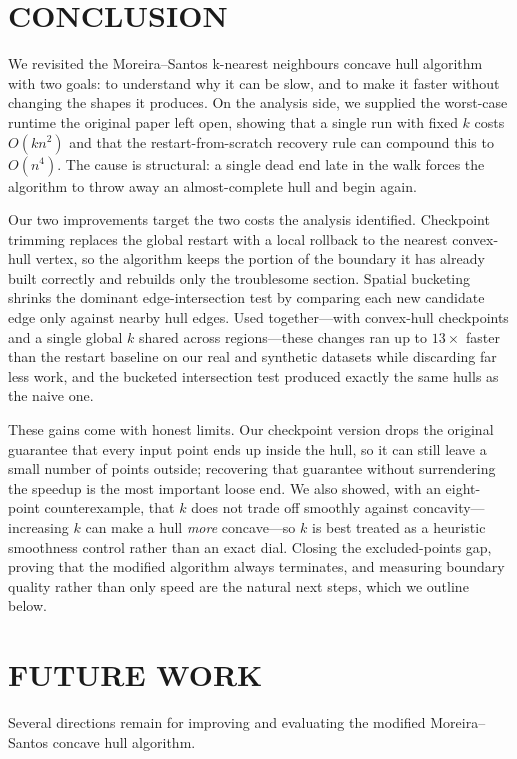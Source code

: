 \documentclass[a4paper,twoside]{article}
\begin{document}
\section{\uppercase{Conclusion}}
We revisited the Moreira--Santos k-nearest neighbours concave hull algorithm with two goals: to understand why it can be slow, and to make it faster without changing the shapes it produces. On the analysis side, we supplied the worst-case runtime the original paper left open, showing that a single run with fixed $k$ costs $O(kn^2)$ and that the restart-from-scratch recovery rule can compound this to $O(n^4)$. The cause is structural: a single dead end late in the walk forces the algorithm to throw away an almost-complete hull and begin again.

Our two improvements target the two costs the analysis identified. Checkpoint trimming replaces the global restart with a local rollback to the nearest convex-hull vertex, so the algorithm keeps the portion of the boundary it has already built correctly and rebuilds only the troublesome section. Spatial bucketing shrinks the dominant edge-intersection test by comparing each new candidate edge only against nearby hull edges. Used together---with convex-hull checkpoints and a single global $k$ shared across regions---these changes ran up to $13\times$ faster than the restart baseline on our real and synthetic datasets while discarding far less work, and the bucketed intersection test produced exactly the same hulls as the naive one.

These gains come with honest limits. Our checkpoint version drops the original guarantee that every input point ends up inside the hull, so it can still leave a small number of points outside; recovering that guarantee without surrendering the speedup is the most important loose end. We also showed, with an eight-point counterexample, that $k$ does not trade off smoothly against concavity---increasing $k$ can make a hull \emph{more} concave---so $k$ is best treated as a heuristic smoothness control rather than an exact dial. Closing the excluded-points gap, proving that the modified algorithm always terminates, and measuring boundary quality rather than only speed are the natural next steps, which we outline below.

\section{\uppercase{Future Work}} 
Several directions remain for improving and evaluating the modified Moreira--Santos concave hull algorithm.
\end{document}
